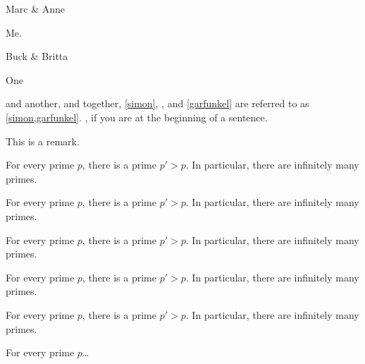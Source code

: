 \begin{couple}
Marc \& Anne
\end{couple}
\begin{singleton}
Me.
\end{singleton}
\begin{couple}
Buck \& Britta
\end{couple}

\begin{callmeal}[Simon]\label{simon}
One
\end{callmeal}
\begin{callmeal}\label{garfunkel}
and another, and together,
\autoref{simon}, ,
and \cref{garfunkel} are referred
to as \cref{simon,garfunkel}.
, if you are at
the beginning of a sentence.
\end{callmeal}


\begin{remark}[name=AAA,label=abc]
This is a remark.
\end{remark}


\begin{BoxI}[Euclid]
For every prime $p$, there is a prime $p'>p$.
In particular, there are infinitely many primes.
\end{BoxI}
\begin{BoxII}[Euclid]
For every prime $p$, there is a prime $p'>p$.
In particular, there are infinitely many primes.
\end{BoxII}

\begin{boxtheorem L}[Euclid]
For every prime $p$, there is a prime $p'>p$.
In particular, there are infinitely many primes.
\end{boxtheorem L}
\begin{boxtheorem M}[Euclid]
For every prime $p$, there is a prime $p'>p$.
In particular, there are infinitely many primes.
\end{boxtheorem M}
\begin{boxtheorem S}[Euclid]
For every prime $p$, there is a prime $p'>p$.
In particular, there are infinitely many primes.
\end{boxtheorem S}

\begin{styledtheorem}[Euclid]
For every prime $p$\dots
\end{styledtheorem}

\ifthmtools
\firsteuclid*
\else
{}
\fi

